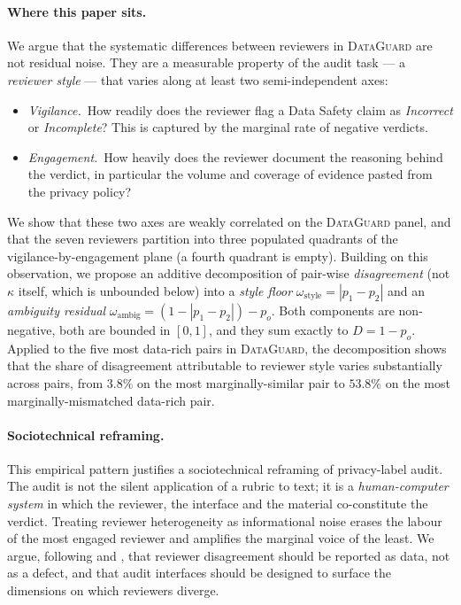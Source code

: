 \documentclass[11pt,a4paper]{article}
\newcommand{\dataguard}{\textsc{DataGuard}}
\begin{document}
\paragraph{Where this paper sits.}
We argue that the systematic differences between reviewers in
\dataguard{} are not residual noise. They are a measurable property of
the audit task --- a \emph{reviewer style} --- that varies along at
least two semi-independent axes:
%
\begin{itemize}[leftmargin=*,nosep,topsep=2pt]
\item \emph{Vigilance.}\ How readily does the reviewer flag a Data Safety
       claim as \emph{Incorrect} or \emph{Incomplete}? This is captured
       by the marginal rate of negative verdicts.
\item \emph{Engagement.}\ How heavily does the reviewer document the
       reasoning behind the verdict, in particular the volume and
       coverage of evidence pasted from the privacy policy?
\end{itemize}
%
We show that these two axes are weakly correlated on the
\dataguard{} panel, and that the seven reviewers partition into
three populated quadrants of the vigilance-by-engagement plane (a
fourth quadrant is empty). Building on this observation, we propose
an additive decomposition of pair-wise \emph{disagreement} (not
$\kappa$ itself, which is unbounded below) into a
\emph{style floor} $\omega_{\text{style}}=|p_1-p_2|$ and an
\emph{ambiguity residual} $\omega_{\text{ambig}}=(1-|p_1-p_2|)-p_o$.
Both components are non-negative, both are bounded in $[0,1]$, and
they sum exactly to $D=1-p_o$. Applied to the five most data-rich
pairs in \dataguard, the decomposition shows that the share of
disagreement attributable to reviewer style varies substantially
across pairs, from $3.8\%$ on the most marginally-similar pair to
$53.8\%$ on the most marginally-mismatched data-rich pair.

\paragraph{Sociotechnical reframing.}
This empirical pattern justifies a sociotechnical reframing of
privacy-label audit. The audit is not the silent application of a
rubric to text; it is a \emph{human-computer system} in which the
reviewer, the interface and the material co-constitute the verdict.
Treating reviewer heterogeneity as informational noise erases the
labour of the most engaged reviewer and amplifies the marginal voice
of the least. We argue, following
\citet{aroyo2015truth} and \citet{plank2022problem}, that reviewer
disagreement should be reported as data, not as a defect, and that
audit interfaces should be designed to surface the dimensions on which
reviewers diverge.
\end{document}
